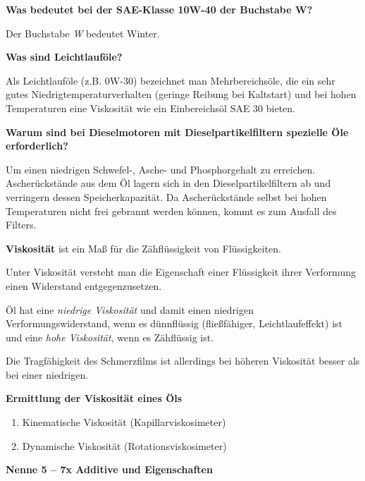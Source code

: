 \textbf{Was bedeutet bei der SAE-Klasse 10W-40 der Buchstabe W?}

Der Buchstabe \emph{W} bedeutet Winter.

\textbf{Was sind Leichtlauföle?}

Als Leichtlauföle (z.B. 0W-30) bezeichnet man Mehrbereichsöle, die ein
sehr gutes Niedrigtemperaturverhalten (geringe Reibung bei Kaltstart)
und bei hohen Temperaturen eine Viskosität wie ein Einbereichsöl SAE 30
bieten.

\textbf{Warum sind bei Dieselmotoren mit Dieselpartikelfiltern spezielle
Öle erforderlich?}

Um einen niedrigen Schwefel-, Asche- und Phosphorgehalt zu erreichen.
Ascherückstände aus dem Öl lagern sich in den Dieselpartikelfiltern ab
und verringern dessen Speicherkapazität. Da Ascherückstände selbst bei
hohen Temperaturen nicht frei gebrannt werden können, kommt es zum
Ausfall des Filters.

\textbf{Viskosität} ist ein Maß für die Zähflüssigkeit von
Flüssigkeiten.

Unter Viskosität versteht man die Eigenschaft einer Flüssigkeit ihrer
Verformung einen Widerstand entgegenzusetzen.

Öl hat eine \emph{niedrige Viskosität} und damit einen niedrigen
Verformungswiderstand, wenn es dünnflüssig (fließfähiger,
Leichtlaufeffekt) ist und eine \emph{hohe Viskosität}, wenn es
Zähflüssig ist.

Die Tragfähigkeit des Schmerzfilms ist allerdings bei höheren Viskosität
besser als bei einer niedrigen.

\textbf{Ermittlung der Viskosität eines Öls}

\begin{enumerate}
\item
  Kinematische Viskosität (Kapillarviskosimeter)
\item
  Dynamische Viskosität (Rotationsviskosimeter)
\end{enumerate}

\textbf{Nenne 5 -- 7x Additive und Eigenschaften}

